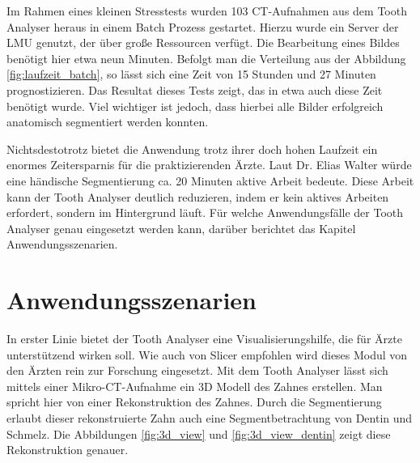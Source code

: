 Im Rahmen eines kleinen Stresstests wurden 103 \ac{CT}-Aufnahmen aus dem Tooth
Analyser heraus in einem Batch Prozess gestartet. Hierzu wurde ein Server der \ac{LMU}
genutzt, der über große Ressourcen verfügt. Die Bearbeitung eines Bildes
benötigt hier etwa neun Minuten. Befolgt man die Verteilung aus der Abbildung \ref{fig:laufzeit_batch},
so lässt sich eine Zeit von 15 Stunden und 27 Minuten prognostizieren. Das Resultat
dieses Tests zeigt, das in etwa auch diese Zeit benötigt wurde. Viel wichtiger ist
jedoch, dass hierbei alle Bilder erfolgreich anatomisch segmentiert werden
konnten.

Nichtsdestotrotz bietet die Anwendung trotz ihrer doch hohen Laufzeit ein
enormes Zeitersparnis für die praktizierenden Ärzte. Laut Dr. Elias Walter würde
eine händische Segmentierung ca. 20 Minuten aktive Arbeit bedeute. Diese Arbeit
kann der Tooth Analyser deutlich reduzieren, indem er kein aktives Arbeiten erfordert,
sondern im Hintergrund läuft. Für welche Anwendungsfälle der Tooth Analyser genau
eingesetzt werden kann, darüber berichtet das Kapitel Anwendungsszenarien.

\section{Anwendungsszenarien}
In erster Linie bietet der Tooth Analyser eine Visualisierungshilfe, die für Ärzte
unterstützend wirken soll. Wie auch von Slicer empfohlen wird dieses Modul von
den Ärzten rein zur Forschung eingesetzt. Mit dem Tooth Analyser lässt sich mittels
einer Mikro-\ac{CT}-Aufnahme ein 3D Modell des Zahnes erstellen. Man spricht hier
von einer Rekonstruktion des Zahnes. Durch die Segmentierung erlaubt dieser
rekonstruierte Zahn auch eine Segmentbetrachtung von Dentin und Schmelz. Die Abbildungen
\ref{fig:3d_view} und \ref{fig:3d_view_dentin} zeigt diese Rekonstruktion genauer.

